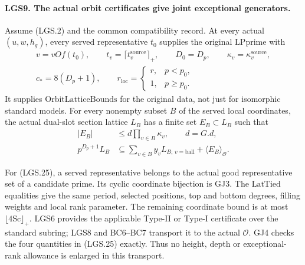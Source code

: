 \paragraph{LGS9. The actual orbit certificates give joint exceptional generators.}
\label{claim:LGS9}
Assume (LGS.2) and the common compatibility record.
At every actual \((u,w,h_g)\), every served representative
\(t_0\) supplies the original \(\mathrm{LPprime}\) with
\[
 \begin{gathered}
 v=vOf(t_0),\qquad t_v=\lceil t_v^{\mathrm{source}}\rceil_+,
 \qquad D_0=D_p,\qquad \kappa_v=\kappa_v^{\mathrm{source}},\\
 c_*=8(D_p+1),\qquad
 r_{\mathrm{loc}}=
       \begin{cases}r,&p<p_0,\\1,&p\ge p_0.\end{cases}
 \end{gathered}                                                   \tag{LGS.25}
\]
It supplies \(\mathrm{OrbitLatticeBounds}\) for the original
data, not just for isomorphic standard models.
For every nonempty subset \(B\) of the served local
coordinates, the actual dual-slot section lattice \(L_B\)
has a finite set \(E_B\subset L_B\) such that
\[
 \begin{split}
 |E_B|&\le d\prod_{v\in B}\kappa_v,\qquad d=G.d,\\
 p^{D_p+1}L_B
   &\subseteq
     \sum_{v\in B}y_v L_{B;\,v=\mathrm{ball}}
                         +\langle E_B\rangle_{\mathcal O}.
 \end{split}                                                     \tag{LGS.26}
\]

For (LGS.25), a served representative belongs to the actual
good representative set of a candidate prime.  Its cyclic
coordinate bijection is GJ3.  The \(\mathrm{LatTied}\)
equalities give the same period, selected positions,
top and bottom degrees, filling weights and local rank
parameter.  The remaining coordinate bound is at most
\(\lfloor4\mathrm{Sc}\rfloor_+\).
LGS6 provides the applicable Type-II or Type-I certificate
over the standard subring; LGS8 and BC6--BC7 transport it
to the actual \(\mathcal O\).  GJ4 checks the four
quantities in (LGS.25) exactly.  Thus no height, depth or
exceptional-rank allowance is enlarged in this transport.

